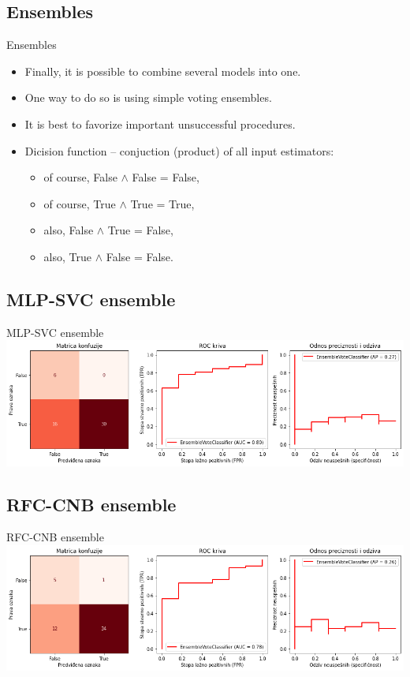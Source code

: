 \documentclass[hyperref={bookmarks=false}]{beamer}
\begin{document}
\subsection{Ensembles}
\begin{frame}{Ensembles}
\begin{itemize}
    \item Finally, it is possible to combine several models into one.
    \item One way to do so is using simple voting ensembles.
    \item It is best to favorize important unsuccessful procedures.
    \item Dicision function -- conjuction (product) of all input estimators:
    \begin{itemize}
        \item of course, False $\wedge$ False = False,
        \item of course, True $\wedge$ True = True,
        \item also, False $\wedge$ True = False,
        \item also, True $\wedge$ False = False.
    \end{itemize}
\end{itemize}
\end{frame}

\subsection{MLP-SVC ensemble}
\begin{frame}{MLP-SVC ensemble}
\includegraphics[width=\textwidth]{mlpsvc.png}
\end{frame}

\subsection{RFC-CNB ensemble}
\begin{frame}{RFC-CNB ensemble}
\includegraphics[width=\textwidth]{forcnb.png}
\end{frame}
\end{document}
